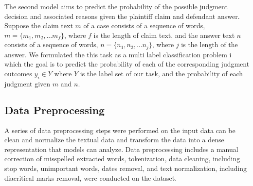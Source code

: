 \documentclass[sn-mathphys,Numbered]{sn-jnl}%
\theoremstyle{thmstyleone}%
\theoremstyle{thmstyletwo}%
\theoremstyle{thmstylethree}%
\begin{document}
 The second  model aims to predict the probability of the possible judgment decision and associated reasons given the plaintiff claim and defendant answer. Suppose the claim text $m$ of a case consists of a sequence  of words, $m=\{ m_1,m_2,...m_f\}$, where $f$ is the length of claim text, and the answer text $n$ consists of a sequence of words, $n= \{n_1,n_2,...n_j\}$, where $j$ is the length of the answer. We formulated the this task as a multi label classification problem i which the goal is to predict the probability of each of the corresponding judgment outcomes $y_i \in Y$  where $Y$ is the label set of our task, and the probability of each judgment given $m$ and $n$.



 
\subsection{Data Preprocessing}
A series of data preprocessing steps were performed on the input data can be clean and normalize the textual data and transform the data into a dense representation that models can analyze. Data preprocessing includes a manual correction of misspelled extracted words, tokenization, data cleaning, including stop words,  unimportant words, dates removal, and text normalization, including diacritical marks removal, were conducted on the dataset.
\end{document}
